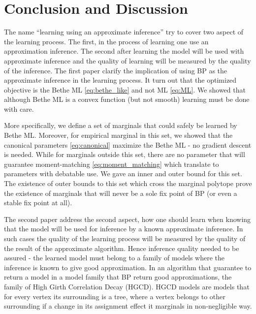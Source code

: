 \chapter{Conclusion and Discussion } %
\label{con} %
The name ``learning using an approximate inference''  try to cover two aspect of the learning process.
The first, in the process of learning one use an approximation inference.
The second after learning the model will be used with approximate inference and the quality of learning will be measured by the quality of the inference.
The first paper  clarify the implication of using BP as the approximate inference in the learning process.
It turn out that the optimized objective is the Bethe ML \eqref{eq:bethe_like} and not ML \eqref{eq:ML}.
We showed that although Bethe ML is a convex function (but not smooth) learning must be done with care.

More specifically, we define a set of marginals that could safely be learned by Bethe ML.
Moreover, for empirical marginal in this set, we showed that the canonical parameters \eqref{eq:canonical}  maximize the Bethe ML - no gradient descent is needed.
While for marginals outside this set, there are no parameter that will guarantee moment-matching \eqref{eq:moment_matching}  which translate to parameters with debatable use.
We gave an inner and outer bound for this set.
The existence of outer bounds to this set which cross the marginal polytope prove the existence of marginals that will never be a sole fix point of BP (or even a stable fix point at all).

The second paper address the second aspect, how one should learn when knowing that the model will be used for inference by a known approximate inference.
In such cases the quality of the learning process will be measured by the quality of the result of the approximate algorithm. 
Hence inference quality needed to be assured  - the learned  model must belong to a family of models where the inference is known to give good approximation.
In  an algorithm that guarantee to return a model in a model family that BP return good approximations, the family of High Girth Correlation Decay (HGCD).
HGCD models are models that for every vertex its surrounding is a tree, where a vertex belongs to other surrounding if a change in its assignment effect it marginals in non-negligible way.

